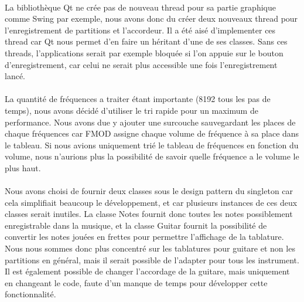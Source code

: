 \paragraph{}
La bibliothèque Qt ne crée pas de nouveau thread pour sa partie graphique comme Swing par exemple, nous avons donc du créer deux nouveaux 
thread pour l'enregistrement de partitions et l'accordeur. Il a été aisé d'implementer ces thread car Qt nous permet d'en 
faire un héritant d'une de ses classes. Sans ces threads, l'applications serait par exemple bloquée si l'on appuie sur le 
bouton d'enregistrement, car celui ne serait plus accessible une fois l'enregistrement lancé.

\paragraph{}
La quantité de fréquences a traiter étant importante (8192 tous les pas de temps), nous avons décidé d'utiliser 
le tri rapide pour un maximum de performance. Nous avons due y ajouter une surcouche sauvegardant les places de chaque fréquences 
car FMOD assigne chaque volume de fréquence à sa place dans le tableau. Si nous avions uniquement trié le tableau de fréquences 
en fonction du volume, nous n'aurions plus la possibilité de savoir quelle fréquence a le volume le plus haut. 

\paragraph{}
Nous avons choisi de fournir deux classes sous le design pattern du singleton car cela simplifiait beaucoup le développement, et 
car plusieurs instances de ces deux classes serait inutiles. La classe Notes fournit donc toutes les notes possiblement enregistrable 
dans la musique, et la classe Guitar fournit la possibilité de convertir les notes jouées en frettes pour permettre l'affichage de la 
tablature. Nous nous sommes donc plus concentré sur les tablatures pour guitare et non les partitions en général, 
mais il serait possible de l'adapter pour tous les instrument. Il est également possible de changer l'accordage de la guitare, mais 
uniquement en changeant le code, faute d'un manque de temps pour développer cette fonctionnalité.

\paragraph{}
